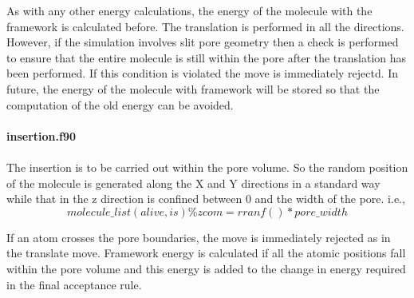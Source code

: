 As with any other energy calculations, the energy of the molecule with
the framework is calculated before. The translation is performed in all
the directions. However, if the simulation involves slit pore geometry
then a check is performed to ensure that the entire molecule is still
within the pore after the translation has been performed. If this condition
is violated the move is immediately rejectd. In future, the energy of
the molecule with framework will be stored so that the computation
of the old energy can be avoided. \\ \\
%
{\bf insertion.f90} \\ \\
%
The insertion is to be carried out within the pore volume. So the random
position of the molecule is generated along the X and Y directions in a
standard way while that in the z direction is confined between 0 and the
width of the pore. i.e.,
\begin{equation}
{\displaystyle molecule\_list(alive,is)\%zcom = rranf() * pore\_width}
\end{equation}


If an atom crosses the pore boundaries, the move is
immediately rejected as in the translate move. Framework energy is calculated
if all the atomic positions fall within the pore volume and this energy
is added to the change in energy required in the final acceptance rule.






